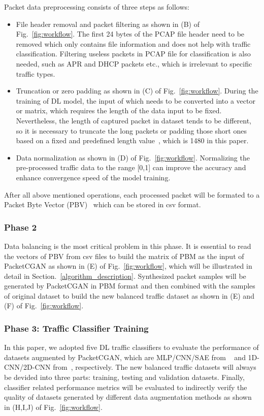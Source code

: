 \documentclass[conference]{IEEEtran}
\begin{document}
Packet data preprocessing consists of three steps as follows:
\begin{itemize}
	\item File header removal and packet filtering as shown in (B) of Fig.~\ref{fig:workflow}. The first 24 bytes of the PCAP file header need to be removed which only contains file information and does not help with traffic classification. Filtering useless packets in PCAP file for classification is also needed, such as APR and DHCP packets etc., which is irrelevant to specific traffic types.
	\item Truncation or zero padding as shown in (C) of Fig.~\ref{fig:workflow}. During the training of DL model, the input of which needs to be converted into a vector or matrix, which requires the length of the data input to be fixed. Nevertheless, the length of captured packet in dataset tends to be different, so it is necessary to truncate the long packets or padding those short ones based on a fixed and predefined length value~\cite{r8}, which is 1480 in this paper. 
	\item Data normalization as shown in (D) of Fig.~\ref{fig:workflow}. Normalizing the pre-processed traffic data to the range [0,1] can improve the accuracy and enhance convergence speed of the model training. 
\end{itemize}

After all above mentioned operations, each processed packet will be formated to a Packet Byte Vector (PBV)~\cite{Datanet} which can be stored in csv format.

\subsubsection{Phase 2}
Data balancing is the most critical problem in this phase. It is essential to read the vectors of PBV from csv files to build the matrix of PBM as the input of PacketCGAN as shown in (E) of Fig.~\ref{fig:workflow}, which will be illustrated in detail in Section.~\ref{algorithm_description}. Synthesized packet samples will be generated by PacketCGAN in PBM format and then combined with the samples of original dataset to build the new balanced traffic dataset as shown in (E) and (F) of Fig.~\ref{fig:workflow}.

\subsubsection{Phase 3: Traffic Classifier Training}
In this paper, we adopted five DL traffic classifiers  to evaluate the performance of datasets augmented by PacketCGAN, which are MLP/CNN/SAE from ~\cite{Datanet} and 1D-CNN/2D-CNN from~\cite{Wang-1D-CNN,Wang2D-CNN}, respectively. The new balanced traffic datasets will always be devided into three parts: training, testing and validation datasets. Finally, classifier related performance metrics will be evaluated to indirectly verify the quality of datasets generated by different data augmentation methods as shown in (H,I,J) of Fig.~\ref{fig:workflow}. 
\end{document}
